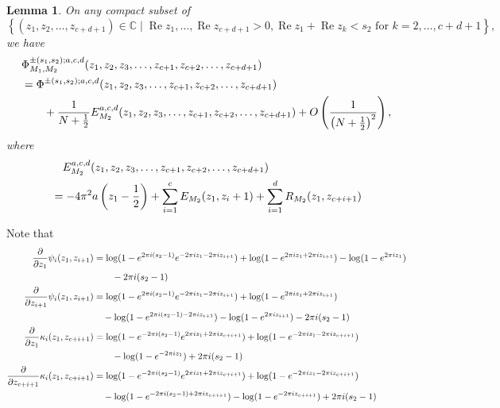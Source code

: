 \documentclass[10pt,a4paper]{article}
\newcommand{\lt}{\left}
\newcommand{\rt}{\right}
\def \CC{\mathbb C}
\def \Re{\operatorname{Re}}
\newtheorem{lemma}{Lemma}
\def\CC{{\mathbb C}}
\def \Re{\operatorname{Re}}
\begin{document}
\begin{lemma}\label{EM_2'}
On any compact subset of 
$$\lt\{ (z_1,z_2,\dots,z_{c+d+1}) \in \CC \mid \Re z_1 , \dots, \Re z_{c+d+1} >0, \Re z_1 + \Re z_k < s_2 \text{ for }k=2,\dots, c+d+1\rt\},$$
we have
\begin{align}
&\Phi^{\pm(s_1,s_2);a,c,d}_{M_1,M_2} (z_1, z_2,z_3, \dots, z_{c+1}, z_{c+2},\dots, z_{c+d+1}) \notag\\
&= \Phi^{\pm (s_1,s_2);a,c,d}  (z_1, z_2,z_3, \dots, z_{c+1}, z_{c+2},\dots, z_{c+d+1}) \notag\\
&\qquad+\frac{1}{N+\frac{1}{2}}E_{M_2}^{a,c,d} (z_1, z_2,z_3, \dots, z_{c+1}, z_{c+2},\dots, z_{c+d+1})+ O\lt(\frac{1}{\lt(N+\frac{1}{2}\rt)^2}\rt),
\end{align}
where
\begin{align}
&\quad E_{M_2}^{a,c,d} (z_1, z_2,z_3, \dots, z_{c+1}, z_{c+2},\dots, z_{c+d+1})\notag\\
&= -4\pi^2 a \lt(z_1-\frac{1}{2}\rt) + \sum_{i=1}^c E_{M_2}(z_1,z_i+1) + \sum_{i=1}^d R_{M_2}(z_1,z_{c+i+1})
\end{align}
\end{lemma}

Note that 
\begin{align}
\frac{\partial}{\partial z_1}  \psi_i (z_1,z_{i+1})
&=  \log(1-e^{2\pi i (s_2-1)}e^{-2\pi i z_1 - 2\pi i z_{i+1}}) + \log(1 - e^{2\pi i z_1 + 2\pi i z_{i+1} }) - \log(1 - e^{2\pi i z_1}) \notag \\
& \qquad  -2\pi i(s_2 - 1)\\
\frac{\partial}{\partial z_{i+1}}  \psi_i (z_1,z_{i+1})
&= \log(1-e^{2\pi i (s_2 -1)}e^{-2\pi i z_1 - 2\pi i z_{i+1}}) + \log(1 - e^{2\pi i z_1 + 2\pi i z_{i+1}}) \notag\\
&\quad   - \log(1 - e^{2\pi i (s_2 - 1) - 2\pi i z_{i+1}}) - \log(1 - e^{2\pi i z_{i+1}})  -2\pi i(s_2 - 1)  \\
\frac{\partial}{\partial z_1}  \kappa_i (z_1,z_{c+i+1})
&=  \log(1-e^{-2\pi i (s_2-1)}e^{2\pi i z_1 + 2\pi i z_{c+i+1}}) + \log(1 - e^{-2\pi i z_1 - 2\pi i z_{c+i+1} }) \notag\\
& \qquad - \log(1 - e^{-2\pi i z_1})  +2\pi i(s_2 - 1)\\
\frac{\partial}{\partial z_{c+i+1}}  \kappa_i (z_1,z_{c+i+1})
&= \log(1-e^{-2\pi i (s_2 -1)}e^{2\pi i z_1 + 2\pi i z_{c+i+1}}) + \log(1 - e^{-2\pi i z_1 - 2\pi i z_{c+i+1}}) \notag\\
&\quad   - \log(1 - e^{-2\pi i (s_2 - 1) + 2\pi i z_{c+i+1}}) - \log(1 - e^{-2\pi i z_{c+i+1}})  + 2\pi i(s_2 - 1)  
\end{align}
\end{document}
